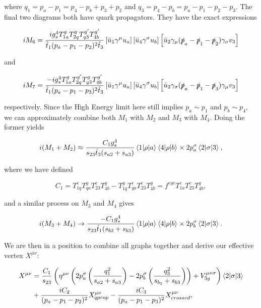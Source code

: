 where $q_1 = p_a - p_1 = p_4 - p_b + p_3 + p_2 $ and $q_3 = p_4 - p_b = p_a - p_1 - p_2 - p_3$. The final two diagrams both have quark propagators. They have the exact expressions

\begin{equation}
iM_6 = \frac{i g_s^4 T^g_{1a} T^{g}_{2q} T^{g'}_{q3}  T^{g'}_{4b}}{\hat{t}_1 (p_a-p_1-p_2)^2 \hat{t}_3}\left[\bar{u}_1 \gamma^\mu u_a \right] \left[\bar{u}_4 \gamma^\sigma u_b \right] \left[\bar{u}_2 \gamma_\mu(\slashed{p}_a - \slashed{p}_1 -\slashed{p}_2) \gamma_\sigma v_3 \right]
\end{equation}

and

\begin{equation}
iM_7 = \frac{-i g_s^4 T^g_{1a} T^{g'}_{2q} T^{g}_{q3}  T^{g'}_{4b}}{\hat{t}_1 (p_a-p_1-p_3)^2 \hat{t}_3}\left[\bar{u}_1 \gamma^\mu u_a \right] \left[\bar{u}_4 \gamma^\sigma u_b \right] \left[\bar{u}_2 \gamma_\sigma(\slashed{p}_a - \slashed{p}_1 -\slashed{p}_3) \gamma_\mu v_3 \right]
\end{equation}

respectively. Since the High Energy limit here still implies $p_a \sim p_1$ and $p_b \sim p_4$, we can approximately combine both $M_1$ with $M_2$ and $M_3$ with $M_4$. Doing the former yields

\begin{equation}
i(M_1 + M_2) \approx \frac{ C_1 g_s^4}{s_{23} \hat{t}_3 (s_{a2} + s_{a3})} \mathinner{\langle1\vert\rho\vert a\rangle}_{} \mathinner{\langle4\vert\rho\vert b\rangle}_{} \times 2 p_a^\sigma \mathinner{\langle2\vert\sigma\vert3\rangle}_{},
\end{equation} 

where we have defined

\begin{equation}
C_1 = T^e_{1q}T^g_{qa} T^e_{23}T^g_{4b} - T^g_{1q}T^e_{qa}T^e_{23}T^g_{4b} = f^{egc}T^c_{1a}T^e_{23}T^g_{4b},
\end{equation}

and a similar process on $M_3$ and $M_4$ gives

\begin{equation}
i(M_3 + M_4) \to \frac{-C_1 g_s^4}{s_{23}\hat{t}_1 (s_{b2}+s_{b3})} \mathinner{\langle1\vert\rho\vert a\rangle}_{} \mathinner{\langle4\vert\rho\vert b\rangle}_{} \times 2 p_b^\sigma \mathinner{\langle2\vert\sigma\vert3\rangle}_{}. 
\end{equation}

We are then in a position to combine all graphs together and derive our effective vertex $X^{\mu \nu}$:

\begin{equation}
\begin{split}
X^{\mu \nu} &=  \frac{C_1}{s_{23}}\left(\eta^{\mu \nu}\left(2 p_a^\sigma \left( \frac{q_1^2}{s_{a2}+s_{a3}} \right) - 2 p_b^\sigma \left(\frac{q_3^2}{s_{b_2}+s_{b3}} \right) \right)+ V_{3g}^{\mu \nu \sigma} \right)\mathinner{\langle2\vert\sigma\vert3\rangle}_{} \\
&+ \frac{i C_2}{(p_a-p_1-p_2)^2} X_{qprop}^{\mu \nu} - \frac{i C_3}{(p_a-p_1-p_3)^2} X_{crossed}^{\mu \nu},
\end{split}
\end{equation}

